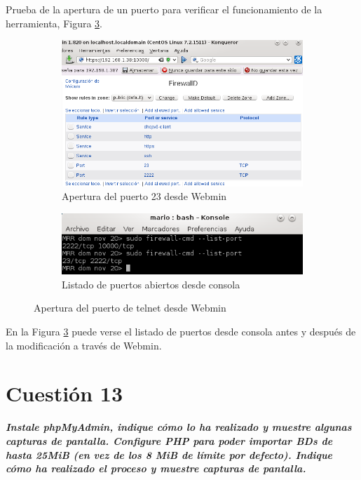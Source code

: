 \begin{itemize}
	Prueba de la apertura de un puerto para verificar el funcionamiento de la herramienta, Figura \ref{fig:webc}.
	\begin{figure}[htbp]
		\centering
		\begin{subfigure}[H]{0.3\textwidth}		
			\includegraphics[scale=0.4]{figuras/figura46.png} 
			\caption{Apertura del puerto 23 desde Webmin} 
			\label{fig:figura46}
		\end{subfigure}	\hspace{30mm}
		\begin{subfigure}[H]{0.3\textwidth}
			\includegraphics[scale=0.5]{figuras/figura47.png} 
			\caption{Listado de puertos abiertos desde consola} 
			\label{fig:figura47}
		\end{subfigure}
		\caption{Apertura del puerto de telnet desde Webmin} 
		\label{fig:webc}	
	\end{figure}
	
	En la Figura \ref{fig:webc} puede verse el listado de puertos desde consola antes y después de la modificación a través de Webmin.
\end{itemize}


\newpage

\section{Cuestión 13}
\textbf{\textit{Instale phpMyAdmin, indique cómo lo ha realizado y muestre
algunas capturas de pantalla. Configure PHP para poder importar BDs de
hasta 25MiB (en vez de los 8 MiB de límite por defecto). Indique cómo ha
realizado el proceso y muestre capturas de pantalla.}}
\\

